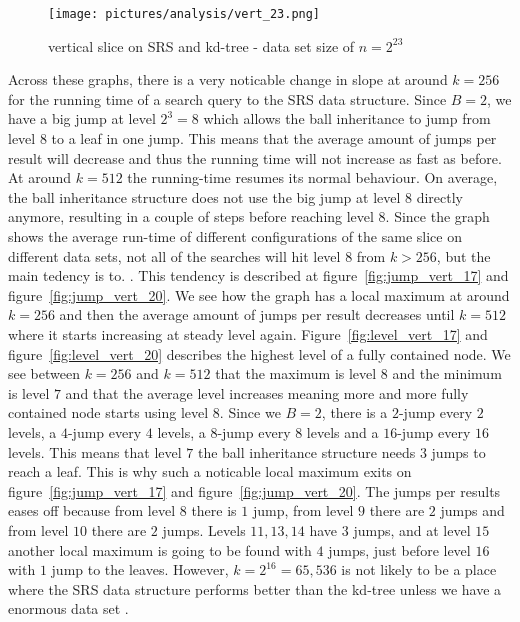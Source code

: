 \begin{figure}[h]
    \centering
    \texttt{[image: pictures/analysis/vert\_23.png]}
    \caption{vertical slice on SRS and kd-tree - data set size of $n=2^{23}$}\label{fig:vert_23}
\end{figure}

\clearpage

Across these graphs, there is a very noticable change in slope at around $k=256$ for the running time of a search query to the SRS data structure. Since $B=2$, we have a big jump at level $2^3 = 8$ which allows the ball inheritance to jump from level $8$ to a leaf in one jump. This means that the average amount of jumps per result will decrease and thus the running time will not increase as fast as before. At around $k=512$ the running-time resumes its normal behaviour. On average, the ball inheritance structure does not use the big jump at level $8$ directly anymore, resulting in a couple of steps before reaching level $8$. Since the graph shows the average run-time of different configurations of the same slice on different data sets, not all of the searches will hit level $8$ from $k>256$, but the main tedency is to. . This tendency is described at figure~\ref{fig:jump_vert_17} and figure~\ref{fig:jump_vert_20}. We see how the graph has a local maximum at around $k=256$ and then the average amount of jumps per result decreases until $k=512$ where it starts increasing at steady level again. Figure~\ref{fig:level_vert_17} and figure~\ref{fig:level_vert_20} describes the highest level of a fully contained node. We see between $k=256$ and $k=512$ that the maximum is level $8$ and the minimum is level $7$ and that the average level increases meaning more and more fully contained node starts using level $8$. Since we $B=2$, there is a $2$-jump every $2$ levels, a $4$-jump every $4$ levels, a $8$-jump every $8$ levels and a $16$-jump every $16$ levels. This means that level $7$ the ball inheritance structure needs $3$ jumps to reach a leaf. This is why such a noticable local maximum exits on figure~\ref{fig:jump_vert_17} and figure~\ref{fig:jump_vert_20}. The jumps per results eases off because from level $8$ there is $1$ jump, from level $9$ there are $2$ jumps and from level $10$ there are $2$ jumps. Levels $11, 13, 14$ have $3$ jumps, and at level $15$ another local maximum is going to be found with $4$ jumps, just before level $16$ with $1$ jump to the leaves. However, $k=2^{16}=65,536$ is not likely to be a place where the SRS data structure performs better than the kd-tree unless we have a enormous data set . 

